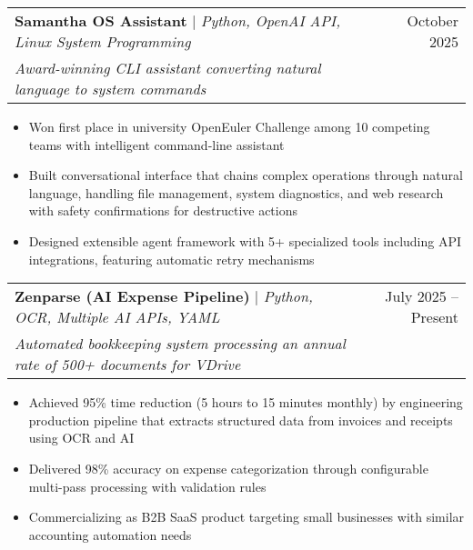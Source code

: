 \documentclass[letterpaper,11pt]{article}
\makeatletter
\newcommand{\resumeItem}[1]{
  \item\small{
    {#1 \vspace{-2pt}}
  }
}
\newcommand{\resumeProjectHeading}[3]{
    \item
    \begin{tabular*}{0.97\textwidth}{l@{\extracolsep{\fill}}r}
      \small#1 & #2 \\
      \textit{\small #3} & \\
    \end{tabular*}\vspace{-7pt}
}
\newcommand{\resumeItemListStart}{\begin{itemize}}
\newcommand{\resumeItemListEnd}{\end{itemize}\vspace{-5pt}}
\makeatother
\begin{document}
\resumeProjectHeading
{\textbf{Samantha OS Assistant} $|$ \emph{Python, OpenAI API, Linux System Programming}}{October 2025}{Award-winning CLI assistant converting natural language to system commands}
\resumeItemListStart
\resumeItem{Won first place in university OpenEuler Challenge among 10 competing teams with intelligent command-line assistant}
\resumeItem{Built conversational interface that chains complex operations through natural language, handling file management, system diagnostics, and web research with safety confirmations for destructive actions}
\resumeItem{Designed extensible agent framework with 5+ specialized tools including API integrations, featuring automatic retry mechanisms}
\resumeItemListEnd

\resumeProjectHeading
{\textbf{Zenparse (AI Expense Pipeline)} $|$ \emph{Python, OCR, Multiple AI APIs, YAML}}{July 2025 -- Present}{Automated bookkeeping system processing an annual rate of 500+ documents for VDrive}
\resumeItemListStart
\resumeItem{Achieved 95\% time reduction (5 hours to 15 minutes monthly) by engineering production pipeline that extracts structured data from invoices and receipts using OCR and AI}
\resumeItem{Delivered 98\% accuracy on expense categorization through configurable multi-pass processing with validation rules}
\resumeItem{Commercializing as B2B SaaS product targeting small businesses with similar accounting automation needs}
\resumeItemListEnd

\end{document}
